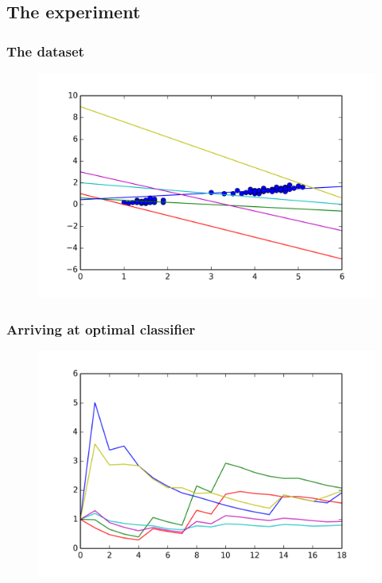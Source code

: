 \documentclass{beamer}
\begin{document}
\subsection{The experiment}
  \begin{frame}
  \frametitle{The dataset}
    \begin{figure}
      \includegraphics[scale=.7]{graphics/gypothesis} 
    \end{figure}
  \end{frame}
  \begin{frame}
  \frametitle{Arriving at optimal classifier}
    \begin{figure}
      \includegraphics[scale=.7]{graphics/convergence15} 
    \end{figure}
  \end{frame}
\end{document}
